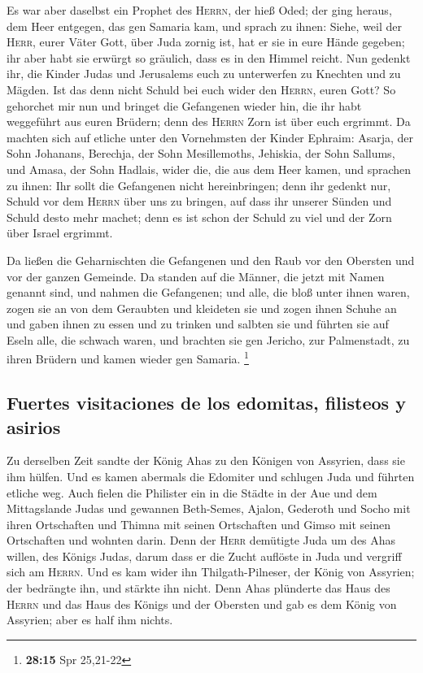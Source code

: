  Es war aber daselbst ein Prophet des \textsc{Herrn}, der
hieß Oded; der ging heraus, dem Heer entgegen, das gen Samaria kam, und
sprach zu ihnen: Siehe, weil der \textsc{Herr}, eurer Väter Gott, über
Juda zornig ist, hat er sie in eure Hände gegeben; ihr aber habt sie
erwürgt so gräulich, dass es in den Himmel reicht.  Nun
gedenkt ihr, die Kinder Judas und Jerusalems euch zu unterwerfen zu
Knechten und zu Mägden. Ist das denn nicht Schuld bei euch wider den
\textsc{Herrn}, euren Gott?  So gehorchet mir nun und
bringet die Gefangenen wieder hin, die ihr habt weggeführt aus euren
Brüdern; denn des \textsc{Herrn} Zorn ist über euch ergrimmt.
 Da machten sich auf etliche unter den Vornehmsten der
Kinder Ephraim: Asarja, der Sohn Johanans, Berechja, der Sohn
Mesillemoths, Jehiskia, der Sohn Sallums, und Amasa, der Sohn Hadlais,
wider die, die aus dem Heer kamen,  und sprachen zu
ihnen: Ihr sollt die Gefangenen nicht hereinbringen; denn ihr gedenkt
nur, Schuld vor dem \textsc{Herrn} über uns zu bringen, auf dass ihr
unserer Sünden und Schuld desto mehr machet; denn es ist schon der
Schuld zu viel und der Zorn über Israel ergrimmt.

 Da ließen die Geharnischten die Gefangenen und den Raub
vor den Obersten und vor der ganzen Gemeinde.  Da standen
auf die Männer, die jetzt mit Namen genannt sind, und nahmen die
Gefangenen; und alle, die bloß unter ihnen waren, zogen sie an von dem
Geraubten und kleideten sie und zogen ihnen Schuhe an und gaben ihnen zu
essen und zu trinken und salbten sie und führten sie auf Eseln alle, die
schwach waren, und brachten sie gen Jericho, zur Palmenstadt, zu ihren
Brüdern und kamen wieder gen Samaria. \footnote{\textbf{28:15} Spr
  25,21-22}

\hypertarget{fuertes-visitaciones-de-los-edomitas-filisteos-y-asirios}{%
\subsection{Fuertes visitaciones de los edomitas, filisteos y
asirios}\label{fuertes-visitaciones-de-los-edomitas-filisteos-y-asirios}}

 Zu derselben Zeit sandte der König Ahas zu den Königen
von Assyrien, dass sie ihm hülfen.  Und es kamen abermals
die Edomiter und schlugen Juda und führten etliche weg. 
Auch fielen die Philister ein in die Städte in der Aue und dem
Mittagslande Judas und gewannen Beth-Semes, Ajalon, Gederoth und Socho
mit ihren Ortschaften und Thimna mit seinen Ortschaften und Gimso mit
seinen Ortschaften und wohnten darin.  Denn der
\textsc{Herr} demütigte Juda um des Ahas willen, des Königs Judas, darum
dass er die Zucht auflöste in Juda und vergriff sich am \textsc{Herrn}.
 Und es kam wider ihn Thilgath-Pilneser, der König von
Assyrien; der bedrängte ihn, und stärkte ihn nicht.  Denn
Ahas plünderte das Haus des \textsc{Herrn} und das Haus des Königs und
der Obersten und gab es dem König von Assyrien; aber es half ihm nichts.

